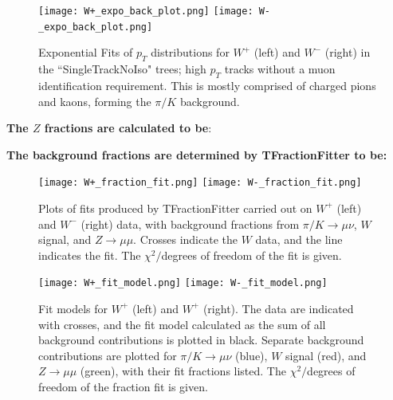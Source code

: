 \documentclass[a4paper]{article}
\begin{document}
\begin{figure}[ht]
  \centering
  \texttt{[image: W+\_expo\_back\_plot.png]}
  \texttt{[image: W-\_expo\_back\_plot.png]} \hspace{3mm}
  \vspace{-4mm}
  \caption{\small Exponential Fits of $p_T$ distributions for $W^+$ (left) and $W^-$ (right) in the ``SingleTrackNoIso" trees; high $p_T$ tracks without a muon identification requirement. This is mostly comprised of charged pions and kaons, forming the $\pi/K$ background.} %
  \label{fig: W exp back fit}
\end{figure}



\textbf{The $Z$ fractions are calculated to be}: \newline



\textbf{The background fractions are determined by TFractionFitter to be:} \newline

\newline


\begin{figure}[hbt]
\centering
\texttt{[image: W+\_fraction\_fit.png]}
\texttt{[image: W-\_fraction\_fit.png]} 
\vspace{-4mm}
\caption{\small Plots of fits produced by TFractionFitter carried out on $W^+$ (left) and $W^-$ (right) data, with background fractions from $\pi/K \xrightarrow{} \mu\nu$, $W$ signal, and $Z \xrightarrow{} \mu\mu$. Crosses indicate the $W$ data, and the line indicates the fit. The $\chi^2/$degrees of freedom of the fit is given.} %
\label{fig: W fraction fit}
\end{figure}

\begin{figure}[ht]
\centering
\texttt{[image: W+\_fit\_model.png]}
\texttt{[image: W-\_fit\_model.png]} 
\vspace{-4mm}
\caption{\small Fit models for $W^+$ (left) and $W^+$ (right). The data are indicated with crosses, and the fit model calculated as the sum of all background contributions is plotted in black. Separate background contributions are plotted for $\pi/K \xrightarrow{} \mu\nu$ (blue), $W$ signal (red), and $Z \xrightarrow{} \mu\mu$ (green), with their fit fractions listed. The $\chi^2/$degrees of freedom of the fraction fit is given.}
\label{fig: W fit model}
\end{figure}
\end{document}
